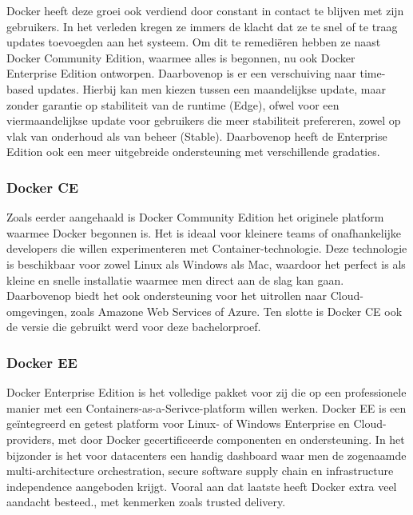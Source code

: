 Docker heeft deze groei ook verdiend door constant in contact te blijven met zijn gebruikers. In het verleden kregen ze immers de klacht dat ze te snel of te traag updates toevoegden aan het systeem. Om dit te remediëren hebben ze naast Docker Community Edition, waarmee alles is begonnen, nu ook Docker Enterprise Edition ontworpen. Daarbovenop is er een verschuiving naar time-based updates. Hierbij kan men kiezen tussen een maandelijkse update, maar zonder garantie op stabiliteit van de runtime (Edge), ofwel voor een viermaandelijkse update voor gebruikers die meer stabiliteit prefereren, zowel op vlak van onderhoud als van beheer (Stable). Daarbovenop heeft de Enterprise Edition ook een meer uitgebreide ondersteuning met verschillende gradaties.

\subsubsection{Docker CE}
Zoals eerder aangehaald is Docker Community Edition het originele platform waarmee Docker begonnen is. Het is ideaal voor kleinere teams of onafhankelijke developers die willen experimenteren met Container-technologie. Deze technologie is beschikbaar voor zowel Linux als Windows als Mac, waardoor het perfect is als kleine en snelle installatie waarmee men direct aan de slag kan gaan. Daarbovenop biedt het ook ondersteuning voor het uitrollen naar Cloud-omgevingen, zoals Amazone Web Services of Azure. Ten slotte is Docker CE ook de versie die gebruikt werd voor deze bachelorproef.

\subsubsection{Docker EE}
Docker Enterprise Edition is het volledige pakket voor zij die op een professionele manier met een Containers-as-a-Serivce-platform willen werken. Docker EE is een geïntegreerd en getest platform voor Linux- of Windows Enterprise en Cloud-providers, met door Docker gecertificeerde componenten en ondersteuning. In het bijzonder is het voor datacenters een handig dashboard waar men de zogenaamde multi-architecture orchestration, secure software supply chain en infrastructure independence aangeboden krijgt. Vooral aan dat laatste heeft Docker extra veel aandacht besteed., met kenmerken zoals trusted delivery.


